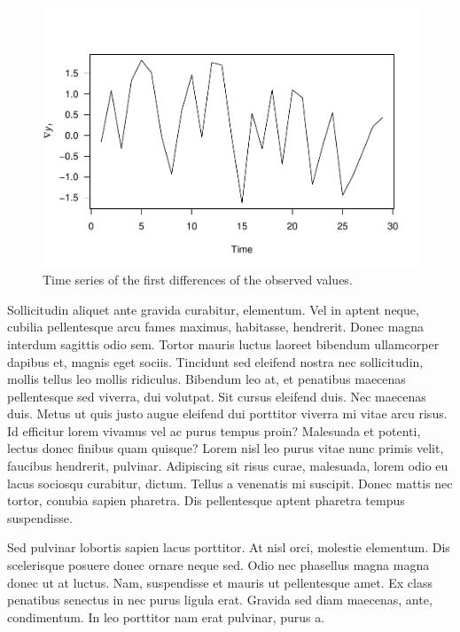 \documentclass[11pt,]{report}
\begin{document}
\vspace{0.5in}

\begin{figure}
\centering
\includegraphics{six_files/figure-latex/rw_diff-1.pdf}
\caption{Time series of the first differences of the observed values.}
\end{figure}

Sollicitudin aliquet ante gravida curabitur, elementum. Vel in aptent
neque, cubilia pellentesque arcu fames maximus, habitasse, hendrerit.
Donec magna interdum sagittis odio sem. Tortor mauris luctus laoreet
bibendum ullamcorper dapibus et, magnis eget sociis. Tincidunt sed
eleifend nostra nec sollicitudin, mollis tellus leo mollis ridiculus.
Bibendum leo at, et penatibus maecenas pellentesque sed viverra, dui
volutpat. Sit cursus eleifend duis. Nec maecenas duis. Metus ut quis
justo augue eleifend dui porttitor viverra mi vitae arcu risus. Id
efficitur lorem vivamus vel ac purus tempus proin? Malesuada et potenti,
lectus donec finibus quam quisque? Lorem nisl leo purus vitae nunc
primis velit, faucibus hendrerit, pulvinar. Adipiscing sit risus curae,
malesuada, lorem odio eu lacus sociosqu curabitur, dictum. Tellus a
venenatis mi suscipit. Donec mattis nec tortor, conubia sapien pharetra.
Dis pellentesque aptent pharetra tempus suspendisse.

Sed pulvinar lobortis sapien lacus porttitor. At nisl orci, molestie
elementum. Dis scelerisque posuere donec ornare neque sed. Odio nec
phasellus magna magna donec ut at luctus. Nam, suspendisse et mauris ut
pellentesque amet. Ex class penatibus senectus in nec purus ligula erat.
Gravida sed diam maecenas, ante, condimentum. In leo porttitor nam erat
pulvinar, purus a.
\end{document}
